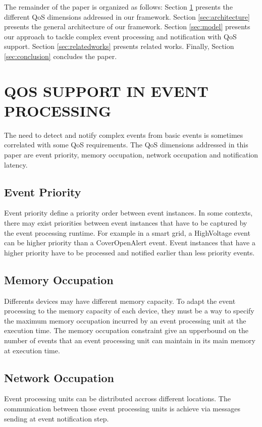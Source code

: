 \documentclass[a4paper,twoside]{article}
\begin{document}
The remainder of the paper is organized as follows: Section \ref{sec:qos_support} presents the different QoS dimensions addressed in our framework. Section \ref{sec:architecture} presents the general architecture of our framework. Section \ref{sec:model} presents our approach to tackle complex event processing and notification with QoS support. Section \ref{sec:relatedworks} presents related works. Finally, Section \ref{sec:conclusion} concludes the paper.
 
\section{\uppercase{QoS Support in Event processing}}
\label{sec:qos_support}
The need to detect and notify complex events from basic events is sometimes correlated with some QoS requirements. The QoS dimensions addressed in this paper are event priority, memory occupation, network occupation and notification latency. 
\subsection{Event Priority}
Event priority define a priority order between event instances. In some contexts, there may exist priorities between event instances that have to be captured by the event processing runtime. For example in a smart grid, a HighVoltage event can be higher priority than a CoverOpenAlert event. Event instances that have a higher priority have to be processed and notified earlier than less priority events. 
\subsection{Memory Occupation}
Differents devices may have different memory capacity. To adapt the event processing to the memory capacity of each device, they must be a way to specify the maximum memory occupation incurred by an event processing unit at the execution time. The memory occupation constraint give an upperbound on the number of events that an event processing unit can maintain in its main memory at execution time.
\subsection{Network Occupation}
Event processing units can be distributed accross different locations. The communication between those event processing units is achieve via messages sending at event notification step. 
\end{document}
